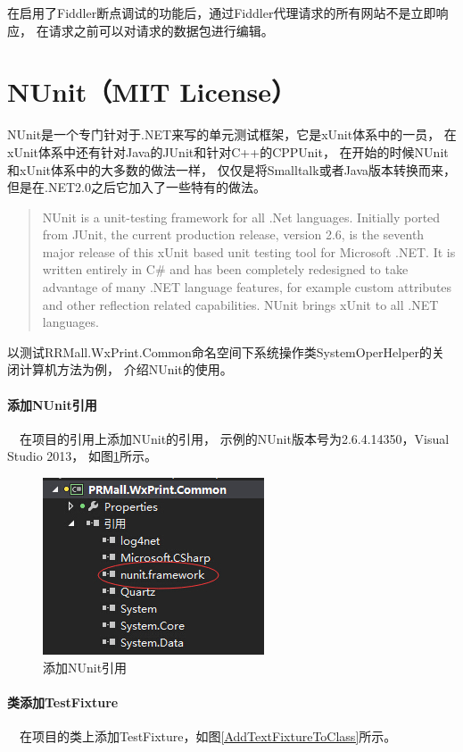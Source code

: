 \documentclass{book}
\begin{document}
在启用了Fiddler断点调试的功能后，通过Fiddler代理请求的所有网站不是立即响应，
在请求之前可以对请求的数据包进行编辑。


\section{NUnit（MIT License）}

NUnit是一个专门针对于.NET来写的单元测试框架，它是xUnit体系中的一员，
在xUnit体系中还有针对Java的JUnit和针对C++的CPPUnit，
在开始的时候NUnit和xUnit体系中的大多数的做法一样，
仅仅是将Smalltalk或者Java版本转换而来，但是在.NET2.0之后它加入了一些特有的做法。

\begin{quotation}
NUnit is a unit-testing framework for all .Net languages. Initially ported from JUnit, 
the current production release, version 2.6, is the seventh major release of this xUnit 
based unit testing tool for Microsoft .NET. It is written entirely in C\# and has been 
completely redesigned to take advantage of many .NET language features, for example custom 
attributes and other reflection related capabilities. NUnit brings xUnit to all .NET languages.
\end{quotation}

以测试RRMall.WxPrint.Common命名空间下系统操作类SystemOperHelper的关闭计算机方法为例，
介绍NUnit的使用。

\paragraph{添加NUnit引用}~~在项目的引用上添加NUnit的引用，
示例的NUnit版本号为2.6.4.14350，Visual Studio 2013，
如图\ref{AddNUnitReference}所示。

\begin{figure}[htbp]
	\centering
	\includegraphics[scale=1]{AddNUnitReference.jpg}
	\caption{添加NUnit引用}
	\label{AddNUnitReference}
\end{figure}
	
\paragraph{类添加TestFixture}~~在项目的类上添加TestFixture，如图\ref{AddTextFixtureToClass}所示。
\end{document}
